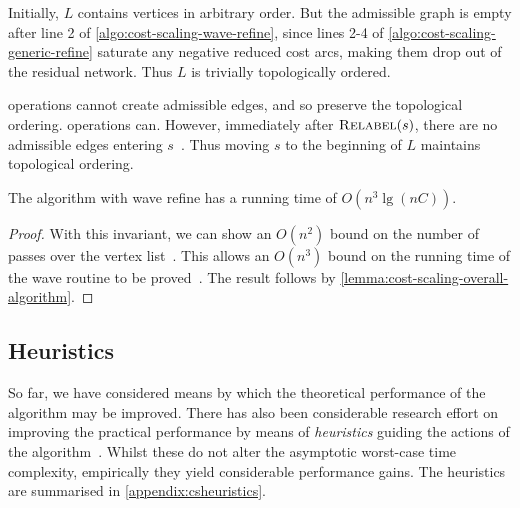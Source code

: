 Initially, $L$ contains vertices in arbitrary order. But the admissible graph is empty after line 2 of \cref{algo:cost-scaling-wave-refine}, since lines 2-4 of \cref{algo:cost-scaling-generic-refine} saturate any negative reduced cost arcs, making them drop out of the residual network. Thus $L$ is trivially topologically ordered.

 operations cannot create admissible edges, and so preserve the topological ordering.  operations can. However, immediately after $\textproc{Relabel}(s)$, there are no admissible edges entering $s$~\cite[lemma~6.5]{Goldberg:1987}. Thus moving $s$ to the beginning of $L$ maintains topological ordering.\\

\begin{thm} \label{thm:cost-scaling-wave-complexity}
The algorithm with wave refine has a running time of $O(n^3 \lg (nC))$.
\end{thm}
\begin{proof}
With this invariant, we can show an $O(n^2)$ bound on the number of passes over the vertex list~\cite[lemma~7.3]{Goldberg:1987}. This allows an $O(n^3)$ bound on the running time of the wave  routine to be proved~\cite[theorem~7.4]{Goldberg:1987}. The result follows by \cref{lemma:cost-scaling-overall-algorithm}.
\end{proof}


\subsection{Heuristics}

So far, we have considered means by which the theoretical performance of the algorithm may be improved. There has also been considerable research effort on improving the practical performance by means of \emph{heuristics} guiding the actions of the algorithm~\cite{Goldberg:1997}. Whilst these do not alter the asymptotic worst-case time complexity, empirically they yield considerable performance gains. The heuristics are summarised in \cref{appendix:csheuristics}. 

